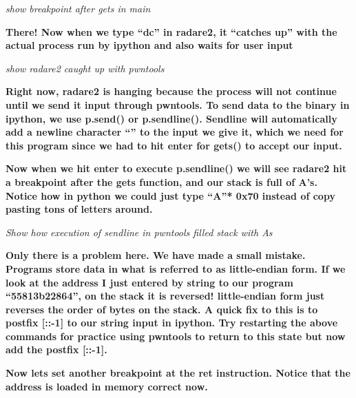 \documentclass[letterpaper]{article}
\newcommand{\sitfig}[3]{
\begin{figure}[H]
\centering
\makebox[\textwidth][c]{
#2
}
\label{#1}
\end{figure}
}
\newcommand{\sitgfx}[4][scale=1.0]{
\sitfig{#3}{\texttt{[image: \#2]}}{#4}
}
\begin{document}
  
\sitgfx[width=5.8335in,height=3.6457in]{reversing-img101.png}{fig:unk}{TODO CAPTION}
 

\textit{show breakpoint after gets in main}

\textbf{There! Now when we type ``dc'' in radare2, it ``catches up'' with the actual process run by ipython and also
waits for user input}

  
\sitgfx[width=5.8335in,height=3.6457in]{reversing-img102.png}{fig:unk}{TODO CAPTION}
 

\textit{show radare2 caught up with pwntools}

\textbf{Right now, radare2 is hanging because the process will not continue until we send it input through pwntools. To
send data to the binary in ipython, we use p.send() or p.sendline(). Sendline will automatically add a newline
character ``'' to the input we give it, which we need for this program since we had to hit enter for gets() to accept
our input.}\newline
  
\sitgfx[width=5.8335in,height=3.6457in]{reversing-img103.png}{fig:unk}{TODO CAPTION}
 

\textbf{Now when we hit enter to execute p.sendline() we will see radare2 hit a breakpoint after the gets function, and
our stack is full of A's. Notice how in python we could just type ``A''* 0x70 instead of copy pasting tons of letters
around.}

  
\sitgfx[width=5.8335in,height=3.6457in]{reversing-img104.png}{fig:unk}{TODO CAPTION}
 

\textit{Show how execution of sendline in pwntools filled stack with As}

\textbf{Only there is a problem here. We have made a small mistake. Programs store data in what is referred to as
little-endian form. If we look at the address I just entered by string to our program ``55813b22864'', on the stack it
is reversed! little-endian form just reverses the order of bytes on the stack. A quick fix to this is to postfix [::-1]
to our string input in ipython. Try restarting the above commands for practice using pwntools to return to this state
but now add the postfix [::-1].}

  
\sitgfx[width=5.8335in,height=3.6457in]{reversing-img105.png}{fig:unk}{TODO CAPTION}
 

\textbf{Now lets set another breakpoint at the ret instruction. Notice that the address is loaded in memory correct
now.}

  
\sitgfx[width=5.8335in,height=1.922in]{reversing-img106.png}{fig:unk}{TODO CAPTION}
 
\end{document}
